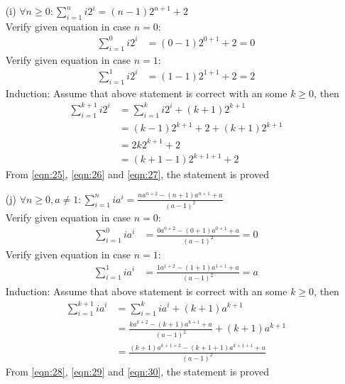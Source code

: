 \begin{enumerate}
    \newpage
    \item[(i)] $\forall n\geq 0: \displaystyle\sum^{n}_{i=1} i2^i = (n-1)2^{n+1}+2$ \\
    Verify given equation in case $n=0$:
        \begin{align}
            \displaystyle\sum^{0}_{i=1} i2^i &= (0-1)2^{0+1}+2 = 0 \label{eqn:25}
        \end{align}
    Verify given equation in case $n=1$:
        \begin{align}
            \displaystyle\sum^{1}_{i=1} i2^i &= (1-1)2^{1+1}+2 = 2 \label{eqn:26}
        \end{align}
    Induction: Assume that above statement is correct with an some $k \geq 0$, then\\
    \begin{align}
        \displaystyle\sum^{k+1}_{i=1} i2^i &= \displaystyle\sum^{k}_{i=1} i2^i + (k+1)2^{k+1} \\
                                        &= (k-1)2^{k+1} +2 + (k+1)2^{k+1} \\
                                        &= 2k2^{k+1} + 2 \\
                                        &= (k+1-1)2^{k+1+1} +2 \label{eqn:27}
    \end{align}
    From \ref{eqn:25}, \ref{eqn:26} and \ref{eqn:27}, the statement is proved
    
    \item[(j)] $\forall n\geq 0, a\neq 1: \displaystyle\sum^{n}_{i=1} ia^i = \frac{na^{n+2}-(n+1)a^{n+1}+a}{(a-1)^2}$ \\
    Verify given equation in case $n=0$:
        \begin{align}
            \displaystyle\sum^{0}_{i=1} ia^i &= \frac{0a^{0+2}-(0+1)a^{0+1}+a}{(a-1)^2} = 0 \label{eqn:28}
        \end{align}
    Verify given equation in case $n=1$:
        \begin{align}
            \displaystyle\sum^{1}_{i=1} ia^i &= \frac{1a^{1+2}-(1+1)a^{1+1}+a}{(a-1)^2} = a \label{eqn:29}
        \end{align}
    Induction: Assume that above statement is correct with an some $k \geq 0$, then\\
    \begin{align}
        \displaystyle\sum^{k+1}_{i=1} ia^i &= \displaystyle\sum^{k}_{i=1} ia^i + (k+1)a^{k+1} \\
                                        &= \frac{ka^{k+2}-(k+1)a^{k+1}+a}{(a-1)^2} + (k+1)a^{k+1} \\
                                        &= \frac{(k+1)a^{k+1+2}-(k+1+1)a^{k+1+1}+a}{(a-1)^2} \label{eqn:30}
    \end{align}
    From \ref{eqn:28}, \ref{eqn:29} and \ref{eqn:30}, the statement is proved
    

\end{enumerate}
